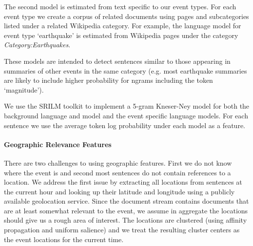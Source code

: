 The second model is estimated from text specific to our event types.  
For each event type we create a corpus of related documents using pages
and subcategories listed under a related Wikipedia category.
For example, the language model for event type `earthquake' is estimated 
from Wikipedia pages under the category \emph{Category:Earthquakes}.  

These models are intended to detect sentences similar to those appearing in 
summaries of other events in the same category 
(e.g. most earthquake summaries are likely to include higher probability for 
ngrams including the token `magnitude').  

We use the SRILM toolkit to implement a 5-gram Kneser-Ney model for both
the background language and model and the event specific language models.
For each sentence we use the average token log probability under each model
as a feature.





\paragraph{Geographic Relevance Features}

There are two challenges to using geographic features. First we do not 
know where the event is and second most sentences do not contain references
to a location.
We address the first issue by extracting all locations from sentences at the
current hour and looking up their latitude and 
longitude using a publicly available geolocation service. Since the document
stream contains documents that are at least somewhat relevant to the event,
we assume in aggregate the locations should give us a rough area of interest.
The locations are clustered (using affinity propagation and uniform salience)
and we treat the resulting cluster centers
as the event locations for the current time.

